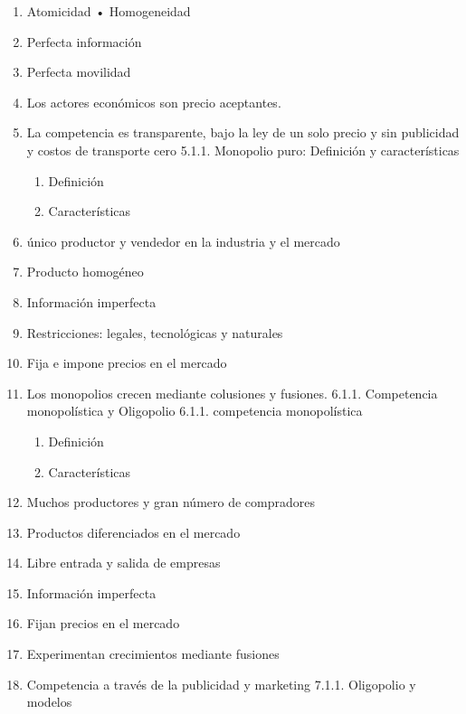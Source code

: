 \documentclass[
  letterpaper,
  DIV=11,
  numbers=noendperiod]{scrartcl}
\providecommand{\tightlist}{%
  \setlength{\itemsep}{0pt}\setlength{\parskip}{0pt}}\usepackage{longtable,booktabs,array}
\begin{document}
\begin{enumerate}
\def\labelenumi{\arabic{enumi}.}
\tightlist
\item
  Atomicidad • Homogeneidad
\item
  Perfecta información
\item
  Perfecta movilidad
\item
  Los actores económicos son precio aceptantes.
\item
  La competencia es transparente, bajo la ley de un solo precio y sin
  publicidad y costos de transporte cero 5.1.1. Monopolio puro:
  Definición y características

  \begin{enumerate}
  \def\labelenumii{\Alph{enumii})}
  \tightlist
  \item
    Definición
  \item
    Características
  \end{enumerate}
\item
  único productor y vendedor en la industria y el mercado
\item
  Producto homogéneo
\item
  Información imperfecta
\item
  Restricciones: legales, tecnológicas y naturales
\item
  Fija e impone precios en el mercado
\item
  Los monopolios crecen mediante colusiones y fusiones. 6.1.1.
  Competencia monopolística y Oligopolio 6.1.1. competencia
  monopolística

  \begin{enumerate}
  \def\labelenumii{\Alph{enumii})}
  \tightlist
  \item
    Definición
  \item
    Características
  \end{enumerate}
\item
  Muchos productores y gran número de compradores
\item
  Productos diferenciados en el mercado
\item
  Libre entrada y salida de empresas
\item
  Información imperfecta
\item
  Fijan precios en el mercado
\item
  Experimentan crecimientos mediante fusiones
\item
  Competencia a través de la publicidad y marketing 7.1.1. Oligopolio y
  modelos


\end{enumerate}
\end{document}
